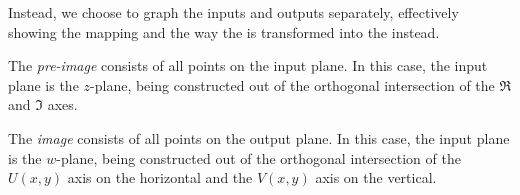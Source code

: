 Instead, we choose to graph the inputs and outputs separately, effectively showing the mapping and the way the  is transformed into the  instead.

\begin{definition}\label{def:Pre_Image}
  The \emph{pre-image} consists of all points on the input plane.
  In this case, the input plane is the $z$-plane, being constructed out of the orthogonal intersection of the $\Re$ and $\Im$ axes.
\end{definition}

\begin{definition}[Image]\label{def:Image}
  The \emph{image} consists of all points on the output plane.
  In this case, the input plane is the $w$-plane, being constructed out of the orthogonal intersection of the $U(x, y)$ axis on the horizontal and the $V(x, y)$ axis on the vertical.
\end{definition}


